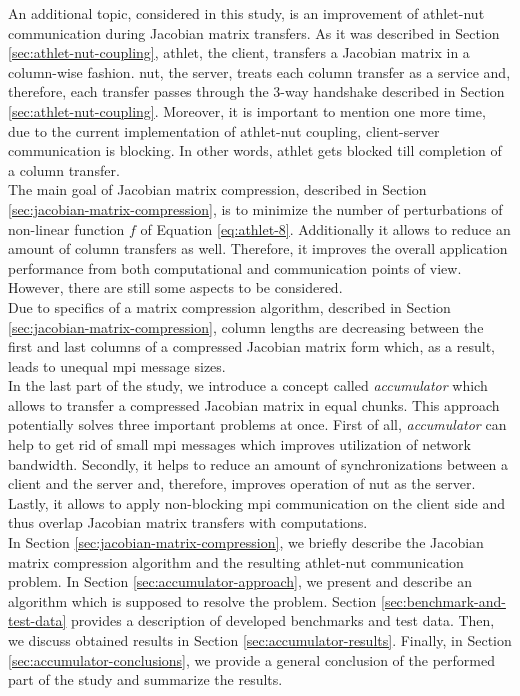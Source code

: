 An additional topic, considered in this study, is an improvement of \acrshort{athlet}-\acrshort{nut} communication during Jacobian matrix transfers. As it was described in Section \ref{sec:athlet-nut-coupling}, \acrshort{athlet}, the client, transfers a Jacobian matrix in a column-wise fashion. \acrshort{nut}, the server, treats each column transfer as a service and, therefore, each transfer passes through the 3-way handshake described in Section \ref{sec:athlet-nut-coupling}. Moreover, it is important to mention one more time,   due to the current implementation of \acrshort{athlet}-\acrshort{nut} coupling, client-server communication is blocking. In other words, \acrshort{athlet} gets blocked till completion of a column transfer. \\


The main goal of Jacobian matrix compression, described in Section \ref{sec:jacobian-matrix-compression}, is to minimize the number of perturbations of non-linear function $f$ of Equation \ref{eq:athlet-8}. Additionally it allows to reduce an amount of column transfers as well. Therefore, it improves the overall application performance from both computational and communication points of view. However, there are still some aspects to be considered.\\


Due to specifics of a matrix compression algorithm, described in Section \ref{sec:jacobian-matrix-compression}, column lengths are decreasing between the first and last columns of a compressed Jacobian matrix form which, as a result, leads to unequal \acrshort{mpi} message sizes.\\


In the last part of the study, we introduce a concept called \textit{accumulator} which allows to transfer a compressed Jacobian matrix in equal chunks. This approach potentially solves three important problems at once. First of all, \textit{accumulator} can help to get rid of small \acrshort{mpi} messages which improves utilization of network bandwidth. Secondly, it helps to reduce an amount of synchronizations between a client and the server and, therefore, improves operation of \acrshort{nut} as the server. Lastly, it allows to apply non-blocking \acrshort{mpi} communication on the client side and thus overlap Jacobian matrix transfers with computations.\\


In Section \ref{sec:jacobian-matrix-compression}, we briefly describe the Jacobian matrix compression algorithm and the resulting \acrshort{athlet}-\acrshort{nut} communication problem. In Section \ref{sec:accumulator-approach}, we present and describe an algorithm which is supposed to resolve the problem. Section \ref{sec:benchmark-and-test-data} provides a description of developed benchmarks and test data. Then, we discuss obtained results in Section \ref{sec:accumulator-results}. Finally, in Section \ref{sec:accumulator-conclusions}, we provide a general conclusion of the performed part of the study and summarize the results.\\

